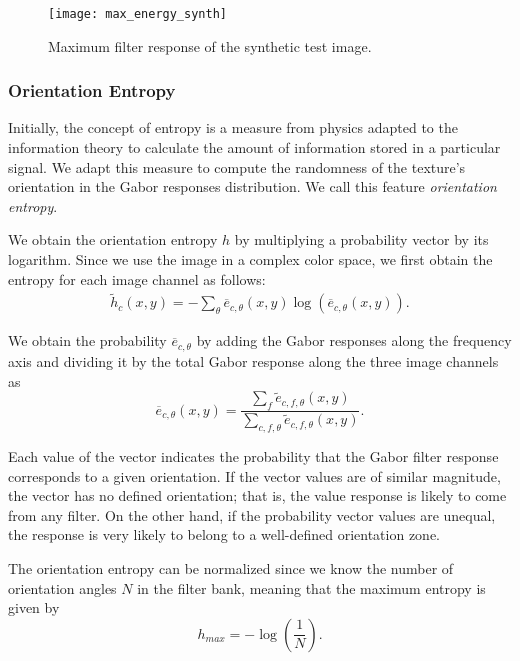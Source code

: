 \begin{figure}[!ht]
	\texttt{[image: max\_energy\_synth]}
    \caption{Maximum filter response of the synthetic test image.}
    \label{fig:max_energy_synth}
\end{figure}

\subsubsection{Orientation Entropy}
Initially, the concept of entropy is a measure from physics adapted to the information theory to calculate the amount of information stored in a particular signal. We adapt this measure to compute the randomness of the texture's orientation in the Gabor responses distribution.  We call this feature \textit{orientation entropy}.

We obtain the orientation entropy $h$ by multiplying a probability vector by its logarithm. Since we use the image in a complex color space, we first obtain the entropy for each image channel as follows:
\begin{gather}
    \widetilde{h}_c(x,y) = -\sum_{\theta} \overline{e}_{c, \theta}(x,y) \log \left(\overline{e}_{c, \theta}(x,y)\right). \label{eq:entropy_orient_ch}
\end{gather}

We obtain the probability $\overline{e}_{c, \theta}$ by adding the Gabor responses along the frequency axis and dividing it by the total Gabor response along the three image channels as 
\begin{equation}
	\overline{e}_{c, \theta}(x,y) =  \frac{\sum_f \widetilde{e}_{c, f, \theta}(x,y)}{\sum_{c, f, \theta}\widetilde{e}_{c, f, \theta} (x,y)}. \label{eq:gabor_energy_ch_orient_prob}
\end{equation}

Each value of the vector indicates the probability that the Gabor filter response corresponds to a given orientation. If the vector values are of similar magnitude, the vector has no defined orientation; that is, the value response is likely to come from any filter. On the other hand, if the probability vector values are unequal, the response is very likely to belong to a well-defined orientation zone.

The orientation entropy can be normalized since we know the number of orientation angles $N$ in the filter bank, meaning that the maximum entropy is given by 
\begin{equation}
    h_{max} = -\log\left(\frac{1}{N}\right). \label{eq:max_entropy_orient} 
\end{equation}

